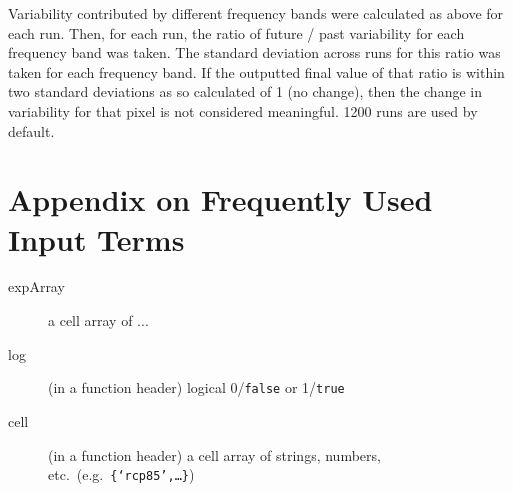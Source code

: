 \documentclass{article}
\begin{document}
Variability contributed by different frequency bands were calculated as above for each run. Then, for each run, the ratio of future / past variability for each frequency band was taken. The standard deviation across runs for this ratio was taken for each frequency band. If the outputted final value of that ratio is within two standard deviations as so calculated of 1 (no change), then the change in variability for that pixel is not considered meaningful. 1200 runs are used by default. 

\section{Appendix on Frequently Used Input Terms}

\begin{description}
\item [expArray] a cell array of ...
\item [log] (in a function header) logical 0/\texttt{false} or 1/\texttt{true}
\item [cell] (in a function header) a cell array of strings, numbers, etc.\ (e.g.\ \texttt{\{`rcp85',\dots\}})
\end{description}
\end{document}
